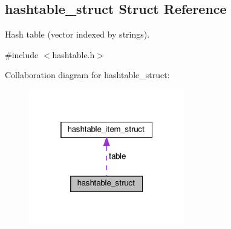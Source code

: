 \hypertarget{structhashtable__struct}{}\subsection{hashtable\+\_\+struct Struct Reference}
\label{structhashtable__struct}


Hash table (vector indexed by strings).  




{\ttfamily \#include $<$hashtable.\+h$>$}



Collaboration diagram for hashtable\+\_\+struct\+:\nopagebreak
\begin{figure}[H]
\begin{center}
\leavevmode
\includegraphics[width=193pt]{structhashtable__struct__coll__graph}
\end{center}
\end{figure}
